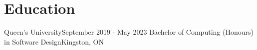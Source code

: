 \section{Education}
    \resumeSubHeadingListStart

    \resumeSubheading
    {Queen's University}{September 2019 - May 2023}
    {Bachelor of Computing (Honours) in Software Design}{Kingston, ON}

    \resumeSubHeadingListEnd
